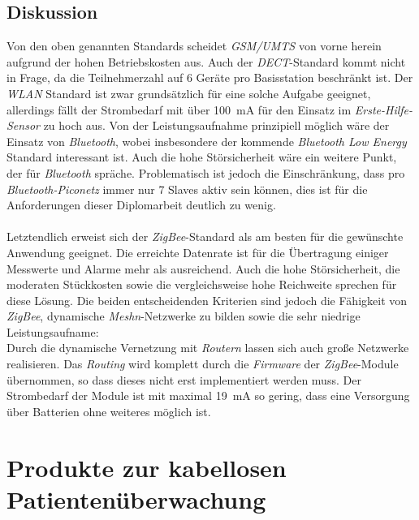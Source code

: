     \subsection{Diskussion}
        Von den oben genannten Standards scheidet \emph{GSM/UMTS} von vorne herein aufgrund der hohen Betriebskosten aus.
        Auch der \emph{DECT}-Standard kommt nicht in Frage, da die Teilnehmerzahl auf 6 Geräte pro Basisstation beschränkt
        ist.  Der \emph{WLAN} Standard ist zwar grundsätzlich für eine solche Aufgabe geeignet, allerdings fällt der 
        Strombedarf mit über 100~mA für den Einsatz im \emph{Erste-Hilfe-Sensor} zu hoch aus. Von der Leistungsaufnahme 
        prinzipiell möglich wäre der Einsatz von \emph{Bluetooth}, wobei insbesondere der kommende 
        \emph{Bluetooth Low Energy} Standard interessant ist. Auch die
        hohe Störsicherheit wäre ein weitere Punkt, der für \emph{Bluetooth} spräche. Problematisch ist jedoch die 
        Einschränkung, dass pro \emph{Bluetooth-Piconetz} immer nur 7 Slaves aktiv sein können, dies ist für die 
        Anforderungen dieser Diplomarbeit deutlich zu wenig.\\
        \\
        Letztendlich erweist sich der \emph{ZigBee}-Standard als am besten für die gewünschte Anwendung geeignet. 
        Die erreichte Datenrate ist für die Übertragung einiger Messwerte und Alarme mehr als ausreichend. Auch die 
        hohe Störsicherheit, die moderaten Stückkosten sowie die vergleichsweise hohe Reichweite sprechen für diese Lösung. 
        Die beiden entscheidenden Kriterien sind jedoch die Fähigkeit von \emph{ZigBee}, dynamische \emph{Meshn}-Netzwerke 
        zu bilden sowie die sehr niedrige Leistungsaufname:\\
        Durch die dynamische Vernetzung mit \emph{Routern} lassen sich auch große Netzwerke realisieren. Das 
        \emph{Routing} wird komplett durch die \emph{Firmware} der \emph{ZigBee}-Module übernommen, so dass dieses 
        nicht erst implementiert werden muss. Der Strombedarf
        der Module ist mit maximal 19~mA so gering, dass eine Versorgung über Batterien ohne weiteres möglich ist.

\section{Produkte zur kabellosen Patientenüberwachung}\label{produkte_zur_patientenueberwachung}

